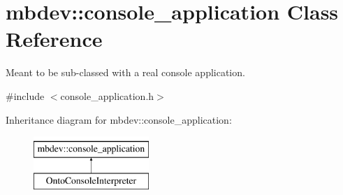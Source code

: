 \hypertarget{classmbdev_1_1console__application}{\section{mbdev\-:\-:console\-\_\-application \-Class \-Reference}
\label{classmbdev_1_1console__application}
}


\-Meant to be sub-\/classed with a real console application.  




{\ttfamily \#include $<$console\-\_\-application.\-h$>$}

\-Inheritance diagram for mbdev\-:\-:console\-\_\-application\-:\begin{figure}[H]
\begin{center}
\leavevmode
\includegraphics[height=2.000000cm]{classmbdev_1_1console__application}
\end{center}
\end{figure}
